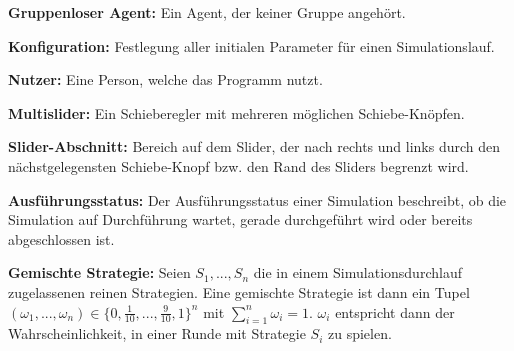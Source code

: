 \documentclass[parskip=full,11pt,twoside]{scrartcl}
\begin{document}
\textbf{Gruppenloser Agent:}
Ein Agent, der keiner Gruppe angehört.

\textbf{Konfiguration:}
Festlegung aller initialen Parameter für einen Simulationslauf.

\textbf{Nutzer:}
Eine Person, welche das Programm nutzt.

\textbf{Multislider:}
Ein Schieberegler mit mehreren möglichen Schiebe-Knöpfen.

\textbf{Slider-Abschnitt:}
Bereich auf dem Slider, der nach rechts und links durch den nächstgelegensten Schiebe-Knopf bzw. den Rand des Sliders begrenzt wird.

\textbf{Ausführungsstatus:}
Der Ausführungsstatus einer Simulation beschreibt, ob die Simulation auf Durchführung wartet, gerade durchgeführt wird oder bereits abgeschlossen ist. 

\textbf{Gemischte Strategie:}
Seien \(S_1,...,S_n\) die in einem Simulationsdurchlauf zugelassenen reinen Strategien. Eine gemischte Strategie ist dann ein Tupel \((\omega_1,...,\omega_n) \in \{0,\frac{1}{10},...,\frac{9}{10},1\}^n\) mit \(\sum_{i=1}^n \omega_i = 1\). \(\omega_i\) entspricht dann der Wahrscheinlichkeit, in einer Runde mit Strategie \(S_i\) zu spielen.
\end{document}
